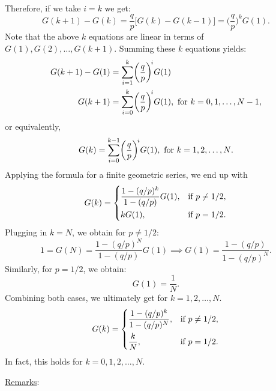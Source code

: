 \begin{Example}
\begin{align*}
    \end{align*}
    Therefore, if we take $ i=k $ we get:
    \[ G(k+1)-G(k)=\frac{q}{p} \bigl[G(k)-G(k-1)\bigr]=\biggl(\frac{q}{p}\biggr)^{\!k}G(1).\]
    Note that the above $ k $ equations are linear in terms of $ G(1),G(2),\ldots,G(k+1) $. Summing these $ k $ equations yields:
    \begin{align*}
        G(k+1)-G(1) & =\sum_{i=1}^{k} \biggl(\frac{q}{p} \biggr)^{\! i}G(1)                                   \\
        G(k+1)      & =\sum_{i=0}^{k} \biggl(\frac{q}{p} \biggr)^{\! i}G(1),\text{ for $ k=0,1,\ldots,N-1 $},
    \end{align*}
    or equivalently,
    \[ G(k)=\sum_{i=0}^{k-1}\biggl(\frac{q}{p} \biggr)^{\! i}G(1),\text{ for $ k=1,2,\ldots,N $}. \]
    Applying the formula for a finite geometric series, we end up with
    \[ G(k)=\begin{dcases}
            \frac{1-(q/p)^k}{1-(q/p)}G(1), & \text{if $p\ne 1/2$}, \\
            k G(1),                        & \text{if $p=1/2$}.    \\
        \end{dcases} \]
    Plugging in $ k=N $, we obtain for $ p\ne 1/2 $:
    \[ 1=G(N)=\frac{1-(q/p)^N}{1-(q/p)}G(1)\implies G(1)=\frac{1-(q/p)}{1-(q/p)^N}.  \]
    Similarly, for $ p=1/2 $, we obtain:
    \[ G(1)=\frac{1}{N}. \]
    Combining both cases, we ultimately get for $ k=1,2,\ldots,N $.
    \[ G(k)=\begin{dcases}
            \frac{1-(q/p)^k}{1-(q/p)^N}, & \text{if $ p\ne 1/2 $}, \\
            \frac{k}{N},                 & \text{if $p=1/2$}.
        \end{dcases} \]
    In fact, this holds for $ k=0,1,2,\ldots,N $.
\end{Example}
\noindent\underline{Remarks}:
